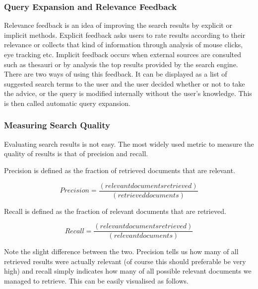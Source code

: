 \subsubsection{Query Expansion and Relevance Feedback}

Relevance feedback is an idea of improving the search results by explicit or implicit methods. Explicit feedback asks users to rate results according to their relevance or collects that kind of information through analysis of mouse clicks, eye tracking etc. Implicit feedback occurs when external sources are consulted such as thesauri or by analysis the top results provided by the search engine. There are two ways of using this feedback. It can be displayed as a list of suggested search terms to the user and the user decided whether or not to take the advice, or the query is modified internally without the user's knowledge. This is then called automatic query expansion.

\subsubsection{Measuring Search Quality}

Evaluating search results is not easy. The most widely used metric to measure the quality of results is that of precision and recall.

Precision is defined as the fraction of retrieved documents that are relevant.

\begin{equation}
Precision = \frac{\left(relevant documents retrieved\right)}{\left(retrieved documents\right)}
\end{equation}

Recall is defined as the fraction of relevant documents that are retrieved.

\begin{equation}
Recall = \frac{\left(relevant documents retrieved\right)}{\left(relevant documents\right)}
\end{equation}

Note the slight difference between the two. Precision tells us how many of all retrieved results were actually relevant (of course this should preferable be very high) and recall simply indicates how many of all possible relevant documents we managed to retrieve. This can be easily visualised as follows.

\def\leftcircle{(0,0) circle (1.5cm)}
\def\rightcircle{(0:2cm) circle (1.5cm)}

